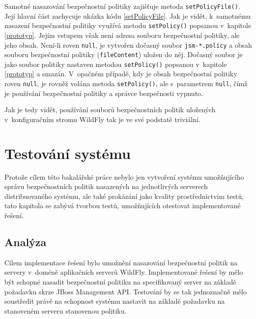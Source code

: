 Samotné nasazování bezpečnostní politiky zajišťuje metoda {\tt setPolicyFile()}. Její hlavní část zachycuje ukázka kódu \ref{setPolicyFile}.
Jak je vidět, k~samotnému nasazení bezpečnostní politiky využívá metodu {\tt setPolicy()} popsanou v~kapitole \ref{prototyp}.
Jejím vstupem však není adresa souboru bezpečnostní politiky, ale jeho obsah. Není-li roven {\tt null},
je vytvořen dočasný soubor {\tt jsm-*.policy} a obsah souboru bezpečnostní politiky ({\tt fileContent}) uložen do něj.
Dočasný soubor je jako soubor politiky nastaven metodou {\tt setPolicy()} popsanou v~kapitole \ref{prototyp} a smazán.
V~opačném případě, kdy je obsah bezpečnostní politiky roven {\tt null}, je rovněž volána metoda {\tt setPolicy()}, ale s~parametrem {\tt null}, čímž je používání bezpečnostní politiky a správce bezpečnosti vypnuto.

Jak je tedy vidět, používání souborů bezpečnostních politik uložených v~konfiguračním stromu WildFly tak je ve své podstatě triviální.

\chapter{Testování systému} \label{testovani}

Protože cílem této bakalářské práce nebylo jen vytvoření systému umožňujícího správu bezpečnostních politik nasazených na jednotlivých serverech distribuovaného systému, ale také prokázání jako kvality prostřednictvím testů, tato kapitola se zabývá tvorbou testů, umožňujících otestovat implementované řešení.

\section{Analýza} %

Cílem implementace řešení bylo umožnění nasazování bezpečnostní politik na servery v~doméně aplikačních serverů WildFly.
Implementované řešení by mělo být schopné nasadit bezpečnostní politiku na specifikovaný server na základě požadavku skrze JBoss Management API.
Testování by se tak jednoznačně mělo soustředit právě na schopnost systému nastavit na základě požadavku na stanoveném serveru stanovenou politiku.

